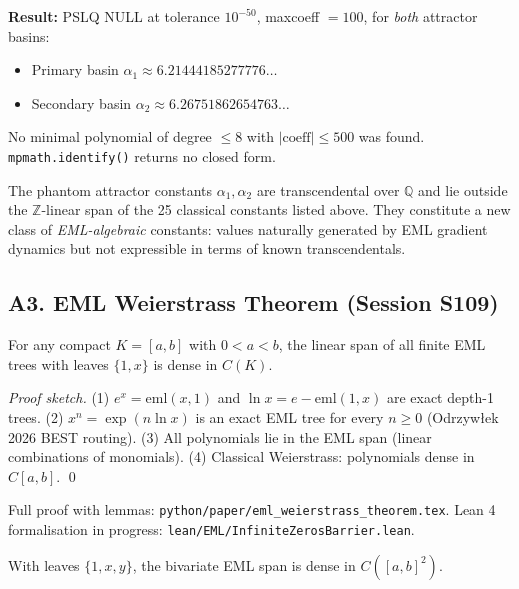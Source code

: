 \textbf{Result:} PSLQ NULL at tolerance $10^{-50}$, maxcoeff $= 100$,
for \emph{both} attractor basins:
\begin{itemize}
  \item Primary basin $\alpha_1 \approx 6.21444185277776\ldots$
  \item Secondary basin $\alpha_2 \approx 6.26751862654763\ldots$
\end{itemize}

No minimal polynomial of degree $\leq 8$ with $|\text{coeff}| \leq 500$
was found. \texttt{mpmath.identify()} returns no closed form.

\begin{conjecture}
The phantom attractor constants $\alpha_1, \alpha_2$ are transcendental
over $\mathbb{Q}$ and lie outside the $\mathbb{Z}$-linear span of the
25 classical constants listed above. They constitute a new class of
\emph{EML-algebraic} constants: values naturally generated by EML
gradient dynamics but not expressible in terms of known transcendentals.
\end{conjecture}

\subsection*{A3. EML Weierstrass Theorem (Session S109)}

\begin{theorem}
For any compact $K = [a,b]$ with $0 < a < b$, the linear span of all
finite EML trees with leaves $\{1, x\}$ is dense in $C(K)$.
\end{theorem}
\begin{proof}[Proof sketch]
(1) $e^x = \mathrm{eml}(x,1)$ and $\ln x = e - \mathrm{eml}(1,x)$ are exact depth-1 trees.
(2) $x^n = \exp(n\ln x)$ is an exact EML tree for every $n \geq 0$
    (Odrzyw\l{}ek 2026 BEST routing).
(3) All polynomials lie in the EML span (linear combinations of monomials).
(4) Classical Weierstrass: polynomials dense in $C[a,b]$. \qed
\end{proof}

Full proof with lemmas: \texttt{python/paper/eml\_weierstrass\_theorem.tex}.
Lean 4 formalisation in progress: \texttt{lean/EML/InfiniteZerosBarrier.lean}.

\begin{corollary}
With leaves $\{1,x,y\}$, the bivariate EML span is dense in $C([a,b]^2)$.
\end{corollary}

